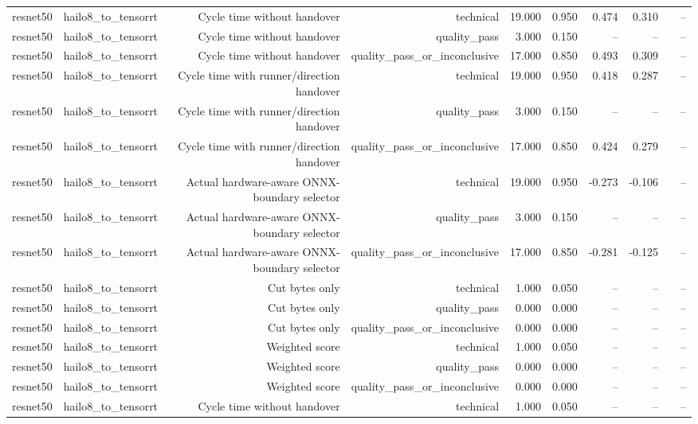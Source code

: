 \begin{table}[t]
\begin{tabular}{lrrrrrrrrr}
resnet50 & hailo8\_to\_tensorrt & Cycle time without handover & technical & 19.000 & 0.950 & 0.474 & 0.310 &  & -- \\
resnet50 & hailo8\_to\_tensorrt & Cycle time without handover & quality\_pass & 3.000 & 0.150 & -- & -- &  & -- \\
resnet50 & hailo8\_to\_tensorrt & Cycle time without handover & quality\_pass\_or\_inconclusive & 17.000 & 0.850 & 0.493 & 0.309 &  & -- \\
resnet50 & hailo8\_to\_tensorrt & Cycle time with runner/direction handover & technical & 19.000 & 0.950 & 0.418 & 0.287 &  & -- \\
resnet50 & hailo8\_to\_tensorrt & Cycle time with runner/direction handover & quality\_pass & 3.000 & 0.150 & -- & -- &  & -- \\
resnet50 & hailo8\_to\_tensorrt & Cycle time with runner/direction handover & quality\_pass\_or\_inconclusive & 17.000 & 0.850 & 0.424 & 0.279 &  & -- \\
resnet50 & hailo8\_to\_tensorrt & Actual hardware-aware ONNX-boundary selector & technical & 19.000 & 0.950 & -0.273 & -0.106 &  & -- \\
resnet50 & hailo8\_to\_tensorrt & Actual hardware-aware ONNX-boundary selector & quality\_pass & 3.000 & 0.150 & -- & -- &  & -- \\
resnet50 & hailo8\_to\_tensorrt & Actual hardware-aware ONNX-boundary selector & quality\_pass\_or\_inconclusive & 17.000 & 0.850 & -0.281 & -0.125 &  & -- \\
resnet50 & hailo8\_to\_tensorrt & Cut bytes only & technical & 1.000 & 0.050 & -- & -- &  & -- \\
resnet50 & hailo8\_to\_tensorrt & Cut bytes only & quality\_pass & 0.000 & 0.000 & -- & -- &  & -- \\
resnet50 & hailo8\_to\_tensorrt & Cut bytes only & quality\_pass\_or\_inconclusive & 0.000 & 0.000 & -- & -- &  & -- \\
resnet50 & hailo8\_to\_tensorrt & Weighted score & technical & 1.000 & 0.050 & -- & -- &  & -- \\
resnet50 & hailo8\_to\_tensorrt & Weighted score & quality\_pass & 0.000 & 0.000 & -- & -- &  & -- \\
resnet50 & hailo8\_to\_tensorrt & Weighted score & quality\_pass\_or\_inconclusive & 0.000 & 0.000 & -- & -- &  & -- \\
resnet50 & hailo8\_to\_tensorrt & Cycle time without handover & technical & 1.000 & 0.050 & -- & -- &  & -- \\

\end{tabular}
\end{table}
